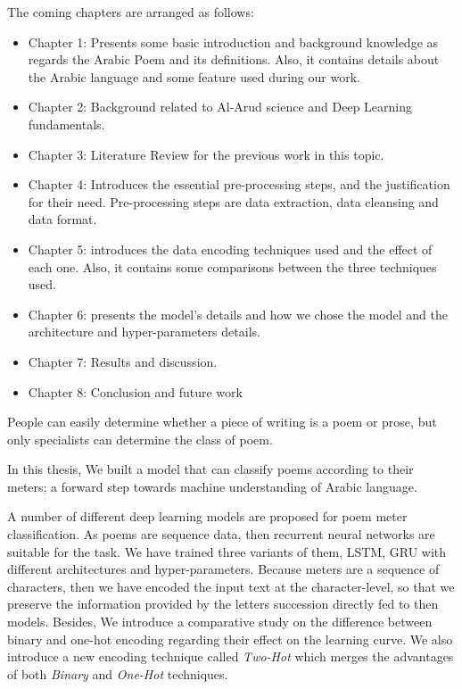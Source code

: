 \newpage


\begin{spacing}{1}\end{spacing}
The coming chapters are arranged as follows:
\begin{itemize}
\item Chapter 1: Presents some basic introduction and background knowledge as regards the Arabic Poem and its definitions. Also, it contains details about the Arabic language and some feature used during our work.
  \item Chapter 2: Background related to Al-Arud science and Deep Learning fundamentals. 
  \item Chapter 3: Literature Review for the previous work in this topic.    
  \item Chapter 4: Introduces the essential pre-processing steps, and the justification for their need. Pre-processing steps are data extraction, data cleansing and data format.
  \item Chapter 5: introduces the data encoding techniques used and the effect of each one. Also, it contains some comparisons between the three techniques used.
  \item Chapter 6: presents the model's details and how we chose the model and the architecture and hyper-parameters details.
  \item Chapter 7: Results and discussion.
  \item Chapter 8: Conclusion and future work
\end{itemize}


 \newpage




\begin{spacing}{1}\end{spacing}


People can easily determine whether a piece of writing is a poem or prose, but only specialists can determine the class of poem.

In this thesis, We built a model that can classify poems according to their meters; a forward step towards machine understanding of Arabic language.

A number of different deep learning models are proposed for poem meter classification. As poems are sequence data, then recurrent neural networks are suitable for the task. We have trained three variants of them, LSTM, GRU with different architectures and hyper-parameters. Because meters are a sequence of characters, then we have encoded the input text at the character-level, so that we preserve the information provided by the letters succession directly fed to then models. Besides, We introduce a comparative study on the difference between binary and one-hot encoding regarding their effect on the learning curve. We also introduce a new encoding technique called \textit{Two-Hot} which merges the advantages of both \textit{Binary} and \textit{One-Hot} techniques.


